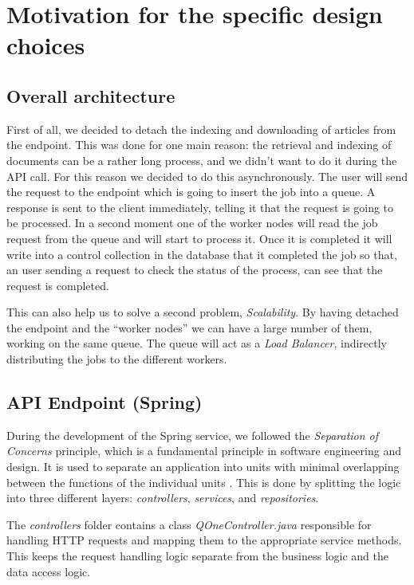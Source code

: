 \section{Motivation for the specific design choices}
\label{ch:motivation}

\subsection{Overall architecture}
First of all, we decided to detach the indexing and downloading of articles
from the endpoint. This was done for one main reason: the retrieval and indexing
of documents can be a rather long process, and we didn't want to do it during
the API call. For this reason we decided to do this asynchronously. The user
will send the request to the endpoint which is going to insert the job into a
queue. A response is sent to the client immediately, telling it that the request
is going to be processed. In a second moment one of the worker nodes will read
the job request from the queue and will start to process it. Once it is completed
it will write into a control collection in the database that it completed the job
so that, an user sending a request to check the status of the process, can
see that the request is completed.

This can also help us to solve a second problem, \textit{Scalability}.
By having detached the endpoint and the ``worker nodes'' we can have a large number
of them, working on the same queue. The queue will act as a \textit{Load Balancer},
indirectly distributing the jobs to the different workers.

\subsection{API Endpoint (Spring)}
During the development of the Spring service, we followed the \textit{Separation of Concerns} principle, which is a
fundamental principle in software engineering and design. It is used to separate an application into units with
minimal overlapping between the functions of the individual units \cite{geeksforgeeks:soc}. This is done by splitting
the logic into three different layers: \textit{controllers}, \textit{services}, and \textit{repositories}.

The \textit{controllers} folder contains a class \textit{QOneController.java} responsible for handling HTTP requests
and mapping them to the appropriate service methods. This keeps the request handling logic separate from the business
logic and the data access logic.

